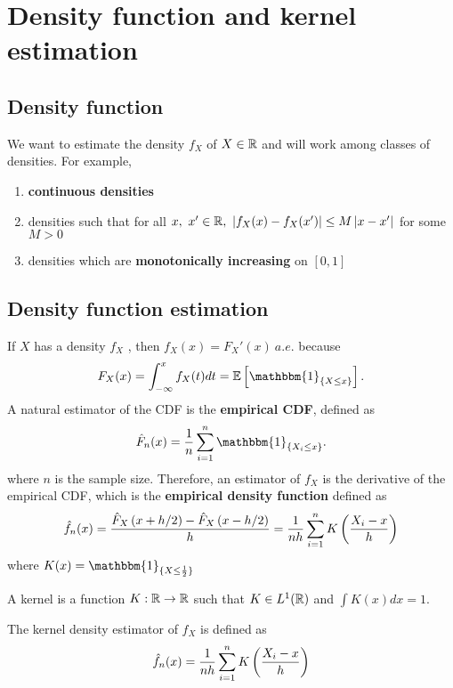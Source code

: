 \section{Density function and kernel estimation}
\subsection{Density function}
We want to estimate the density $f_X$ of $X\in \mathbb{R}$ and will work among classes
of densities. For example,
\begin{enumerate}
    \item \textbf{continuous densities}
    \item densities such that for all $x,\ x'\in \mathbb{R},\ \left| f_X(x)-f_X(x')\right|\le
              M\left| x-x'\right|$ for some $M>0$
    \item densities which are \textbf{monotonically increasing} on $[0,1]$
\end{enumerate}

\subsection{Density function estimation}
If $X$ has a density $f_X$ , then $f_X(x)=F_X'(x)\ a.e.$ because \begin{equation*}
    F_X(x)=\int_{-\infty}^x f_X(t)dt=\E\bra{\mathbbm{1}_{\{X\le x\}}}.
\end{equation*}
A natural estimator of the CDF is the  \textbf{empirical CDF}, defined as
\begin{equation*}
    \hat{F}_n(x)=\frac{1}{n}\sum_{i=1}^n \mathbbm{1}_{\{X_i\le x\}}.
\end{equation*} where $n$ is the sample size. Therefore, an estimator of $f_X$ is the derivative of the empirical CDF, which is the \textbf{empirical density function} defined as \begin{equation*}
    \begin{split}
        \hat{f}_n(x)=\frac{\hat{F}_X\left(x+h/2\right)-\hat{F}_X\left(x-h/2\right)}{h}= \frac{1}{nh}\sum_{i=1}^n K\left(\frac{X_i-x}{h}\right)
    \end{split}
\end{equation*} where $K(x)=\mathbbm{1}_{\{X\le \frac{1}{2}\}}$
\begin{definition}
    A kernel is a function $K:\mathbb{R}\to \mathbb{R}$ such that $K\in L^1(\mathbb{R})$ and $\int K(x)dx=1$.
\end{definition}
\begin{definition}
    The kernel density estimator of $f_X$ is defined as \begin{equation*}
        \hat{f}_n(x)=\frac{1}{nh}\sum_{i=1}^n K\left(\frac{X_i-x}{h}\right)
    \end{equation*}
\end{definition}
